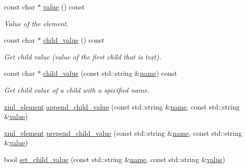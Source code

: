 \begin{DoxyCompactItemize}
const char $\ast$ \hyperlink{classlsl_1_1xml__element_a1a5e666b35c5d7262e4ffbda86b57f73}{value} () const
\begin{DoxyCompactList}\small\item\em Value of the element. \end{DoxyCompactList}\item 
\mbox{\label{classlsl_1_1xml__element_ac99677d44f66ba850afd9b669e26452f}} 
const char $\ast$ \hyperlink{classlsl_1_1xml__element_ac99677d44f66ba850afd9b669e26452f}{child\+\_\+value} () const
\begin{DoxyCompactList}\small\item\em Get child value (value of the first child that is text). \end{DoxyCompactList}\item 
\mbox{\label{classlsl_1_1xml__element_a893102d2d84a444a89099f9c90cb6c31}} 
const char $\ast$ \hyperlink{classlsl_1_1xml__element_a893102d2d84a444a89099f9c90cb6c31}{child\+\_\+value} (const std\+::string \&\hyperlink{classlsl_1_1xml__element_a2e449e85b7e763b1d0db4bb19d2eb7c2}{name}) const
\begin{DoxyCompactList}\small\item\em Get child value of a child with a specified name. \end{DoxyCompactList}\item 
\hyperlink{classlsl_1_1xml__element}{xml\+\_\+element} \hyperlink{classlsl_1_1xml__element_a6a162d1b57049f5ecab6b68207a71d53}{append\+\_\+child\+\_\+value} (const std\+::string \&\hyperlink{classlsl_1_1xml__element_a2e449e85b7e763b1d0db4bb19d2eb7c2}{name}, const std\+::string \&\hyperlink{classlsl_1_1xml__element_a1a5e666b35c5d7262e4ffbda86b57f73}{value})
\item 
\hyperlink{classlsl_1_1xml__element}{xml\+\_\+element} \hyperlink{classlsl_1_1xml__element_a3e7fde09def517574df99c71a0a05d23}{prepend\+\_\+child\+\_\+value} (const std\+::string \&\hyperlink{classlsl_1_1xml__element_a2e449e85b7e763b1d0db4bb19d2eb7c2}{name}, const std\+::string \&\hyperlink{classlsl_1_1xml__element_a1a5e666b35c5d7262e4ffbda86b57f73}{value})
\item 
bool \hyperlink{classlsl_1_1xml__element_a6fe187e03b36cf8fd5f9d3892e99453f}{set\+\_\+child\+\_\+value} (const std\+::string \&\hyperlink{classlsl_1_1xml__element_a2e449e85b7e763b1d0db4bb19d2eb7c2}{name}, const std\+::string \&\hyperlink{classlsl_1_1xml__element_a1a5e666b35c5d7262e4ffbda86b57f73}{value})

\end{DoxyCompactItemize}
